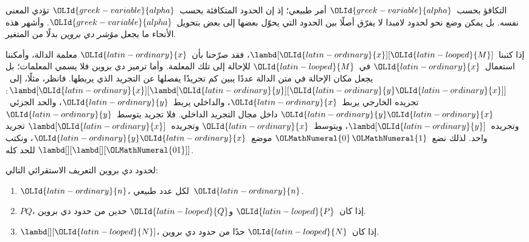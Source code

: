 \documentclass[../../../include/open-logic-section]{subfiles}
\begin{document}


التكافؤ بحسب~$\OLId{greek-variable}{alpha}$ أمر طبيعي؛ إذ إن الحدود المتكافئة بحسب~$\OLId{greek-variable}{alpha}$
تؤدي المعنى نفسه. بل يمكن وضع نحو لحدود لامبدا لا يفرّق أصلًا بين الحدود
التي يحوّل بعضها إلى بعض بتحويل~$\OLId{greek-variable}{alpha}$. وأشهر هذه الأنحاء ما يجعل
\emph{مؤشر دي بروين} بدلًا من المتغير.

إذا كتبنا~$\lambd[\OLId{latin-ordinary}{x}][\OLId{latin-looped}{M}]$، فقد صرّحنا بأن~$\OLId{latin-ordinary}{x}$ معلمة الدالة، وأمكننا استعمال~$\OLId{latin-ordinary}{x}$
في~$\OLId{latin-looped}{M}$ للإحالة إلى تلك المعلمة. وأما ترميز دي بروين فلا يسمي المعلمات؛
بل يجعل مكان الإحالة في متن الدالة عددًا يبين كم تجريدًا يفصلها عن التجريد الذي يربطها.
فانظر، مثلًا، إلى~$\lambd[\OLId{latin-ordinary}{x}][\lambd[\OLId{latin-ordinary}{y}][\OLId{latin-ordinary}{y} \OLId{latin-ordinary}{x}]]$: تجريده الخارجي يربط~$\OLId{latin-ordinary}{x}$، والداخلي يربط~$\OLId{latin-ordinary}{y}$،
والحد الجزئي~$\OLId{latin-ordinary}{y} \OLId{latin-ordinary}{x}$ داخل مجال التجريد الداخلي.
فلا تجريد يتوسط~$\OLId{latin-ordinary}{y}$ وتجريده~$\lambd[\OLId{latin-ordinary}{y}]$، ويتوسط~$\OLId{latin-ordinary}{x}$ وتجريده~$\lambd[\OLId{latin-ordinary}{x}]$ تجريد واحد.
لذلك نضع~$\OLMathNumeral{0}\, \OLMathNumeral{1}$ موضع~$\OLId{latin-ordinary}{y} \OLId{latin-ordinary}{x}$، ونكتب
$\lambd[][\lambd[][\OLMathNumeral{01}]]$ للحد كله.

\begin{defn}
  لحدود دي بروين التعريف الاستقرائي التالي:
  \begin{enumerate}
  \item $\OLId{latin-ordinary}{n}$، لكل عدد طبيعي~$\OLId{latin-ordinary}{n}$.
  \item $PQ$، إذا كان~$\OLId{latin-looped}{P}$ و$\OLId{latin-looped}{Q}$ حدين من حدود دي بروين.
  \item $\lambd[][\OLId{latin-looped}{N}]$، إذا كان~$\OLId{latin-looped}{N}$ حدًا من حدود دي بروين.
  \end{enumerate}
\end{defn}
\end{document}
